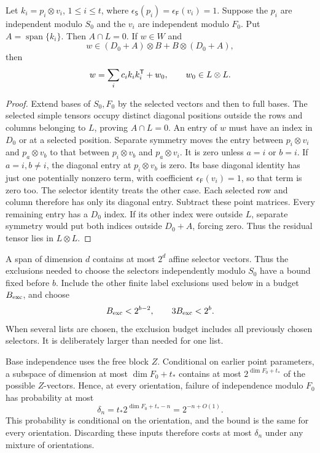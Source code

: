 \begin{lemma}\label{lem:protected-atoms}
Let $k_i=p_i\otimes v_i$, $1\le i\le t$, where
$\epsilon_{\mathsf S}(p_i)=\epsilon_{\mathsf F}(v_i)=1$.
Suppose the $p_i$ are independent modulo $S_0$ and the $v_i$ are
independent modulo $F_0$. Put $A=\operatorname{span}\{k_i\}$.
Then $A\cap L=0$. If $w\in W$ and
\[
 w\in(D_0+A)\otimes B+B\otimes(D_0+A),
\]
then
\[
 w=\sum_i c_i k_i k_i^{\mathsf T}+w_0,\qquad w_0\in L\otimes L.
\]
\end{lemma}
\begin{proof}
Extend bases of $S_0,F_0$ by the selected vectors and then to full bases.
The selected simple tensors occupy distinct diagonal positions outside
the rows and columns belonging to $L$, proving $A\cap L=0$.
An entry of $w$ must have an index in $D_0$ or at a selected position.
Separate symmetry moves the entry between $p_i\otimes v_i$ and
$p_a\otimes v_b$ to that between $p_i\otimes v_b$ and $p_a\otimes v_i$.
It is zero unless $a=i$ or $b=i$. If $a=i,b\ne i$, the diagonal entry
at $p_i\otimes v_b$ is zero. Its base diagonal identity has just one
potentially nonzero term, with coefficient
$\epsilon_{\mathsf F}(v_i)=1$, so that term is zero too.
The selector identity treats the other case. Each selected row and
column therefore has only its diagonal entry. Subtract these point
matrices. Every remaining entry has a $D_0$ index. If its other index
were outside $L$, separate symmetry would put both indices outside
$D_0+A$, forcing zero. Thus the residual tensor lies in $L\otimes L$.
\end{proof}


A span of dimension \(d\) contains at most \(2^d\) affine selector vectors.
Thus the exclusions needed to choose the selectors independently modulo
\(S_0\) have a bound fixed before \(b\). Include the other finite label
exclusions used below in a budget \(B_{\rm exc}\), and choose
\begin{equation}\label{eq:selector-size}
 B_{\rm exc}<2^{b-2},\qquad 3B_{\rm exc}<2^b.
\end{equation}
When several lists are chosen, the exclusion budget includes all previously
chosen selectors. It is deliberately larger than needed for one list.

Base independence uses the free block \(Z\). Conditional on earlier point
parameters, a subspace of dimension at most \(\dim F_0+t_*\) contains at
most \(2^{\dim F_0+t_*}\) of the possible \(Z\)-vectors. Hence, at every
orientation, failure of independence modulo \(F_0\) has probability at most
\begin{equation}\label{eq:base-rejection}
 \delta_n=t_*2^{\dim F_0+t_*-n}=2^{-n+O(1)}.
\end{equation}
This probability is conditional on the orientation, and the bound is
the same for every orientation. Discarding these inputs therefore costs
at most \(\delta_n\) under any mixture of orientations.

